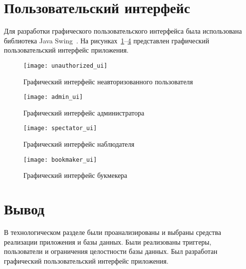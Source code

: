 \section{Пользовательский интерфейс}

Для разработки графического пользовательского интерфейса была использована библиотека Java Swing~\cite{swing}. На рисунках~\ref{unauthorized_ui}--\ref{bookmaker_ui} представлен графический пользовательский интерфейс приложения.
\begin{figure}[H]
	\centering
	\texttt{[image: unauthorized\_ui]}
	\caption{Графический интерфейс неавторизованного пользователя}
	\label{unauthorized_ui}
\end{figure}
\begin{figure}[H]
	\centering
	\texttt{[image: admin\_ui]}
	\caption{Графический интерфейс администратора}
	\label{admin_ui}
\end{figure}
\begin{figure}[H]
	\centering
	\texttt{[image: spectator\_ui]}
	\caption{Графический интерфейс наблюдателя}
	\label{spectator_ui}
\end{figure}
\begin{figure}[H]
	\centering
	\texttt{[image: bookmaker\_ui]}
	\caption{Графический интерфейс букмекера}
	\label{bookmaker_ui}
\end{figure}

\section*{Вывод}

В технологическом разделе были проанализированы и выбраны средства реализации приложения и базы данных. Были реализованы триггеры, пользователи и ограничения целостности базы данных. Был разработан графический пользовательский интерфейс приложения.

\clearpage
